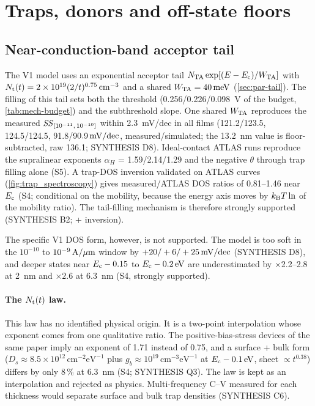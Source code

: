 \section{Traps, donors and off-state floors}\label{sec:mech-traps}

\subsection{Near-conduction-band acceptor tail}
The V1 model uses an exponential acceptor tail $N_{\mathrm{TA}}\exp[(E-E_{\mathrm{c}})/W_{\mathrm{TA}}]$ with $N_{\mathrm{t}}(t) = 2\times10^{19}(2/t)^{0.75}\,\mathrm{cm}^{-3}$ and a shared $W_{\mathrm{TA}} = \SI{40}{meV}$ (\cref{sec:par-tail}). The filling of this tail sets both the threshold (0.256/0.226/\SI{0.098}{V} of the budget, \cref{tab:mech-budget}) and the subthreshold slope. One shared $W_{\mathrm{TA}}$ reproduces the measured $\mathit{SS}_{[10^{-11},\,10^{-10}]}$ within \SI{2.3}{mV/dec} in all films (121.2/123.5, 124.5/124.5, 91.8/$90.9\,\mathrm{mV/dec}$, measured/simulated; the \SI{13.2}{nm} value is floor-subtracted, raw 136.1; SYNTHESIS D8). Ideal-contact ATLAS runs reproduce the supralinear exponents $\alpha_H$ = 1.59/2.14/1.29 and the negative $\theta$ through trap filling alone (S5). A trap-DOS inversion validated on ATLAS curves (\cref{fig:trap_spectroscopy}) gives measured/ATLAS DOS ratios of 0.81--1.46 near $E_{\mathrm{c}}$ (S4; conditional on the mobility, because the energy axis moves by $k_{\mathrm{B}}T\ln$ of the mobility ratio). The tail-filling mechanism is therefore strongly supported (SYNTHESIS B2; \evCAL{} + inversion).

The specific V1 DOS form, however, is not supported. The model is too soft in the $10^{-10}$ to $10^{-9}\,\mathrm{A}/\mu\mathrm{m}$ window by $+20/+6/+25\,\mathrm{mV/dec}$ (SYNTHESIS D8), and deeper states near $E_{\mathrm{c}} - 0.15$ to $E_{\mathrm{c}} - \SI{0.2}{eV}$ are underestimated by $\times$2.2--2.8 at \SI{2}{nm} and $\times 2.6$ at \SI{6.3}{nm} (S4, strongly supported).

\paragraph{The $N_{\mathrm{t}}(t)$ law.} This law has no identified physical origin. It is a two-point interpolation whose exponent comes from one qualitative ratio. The positive-bias-stress devices of the same paper imply an exponent of 1.71 instead of 0.75, and a surface + bulk form ($D_s \approx 8.5\times10^{12}\,\mathrm{cm^{-2}eV^{-1}}$ plus $g_b \approx 10^{19}\,\mathrm{cm^{-3}eV^{-1}}$ at $E_{\mathrm{c}} - \SI{0.1}{eV}$, sheet $\propto t^{0.38}$) differs by only 8\,\% at \SI{6.3}{nm} (S4; SYNTHESIS Q3). The law is kept as an interpolation and rejected as physics. Multi-frequency C--V measured for each thickness would separate surface and bulk trap densities (SYNTHESIS C6).

